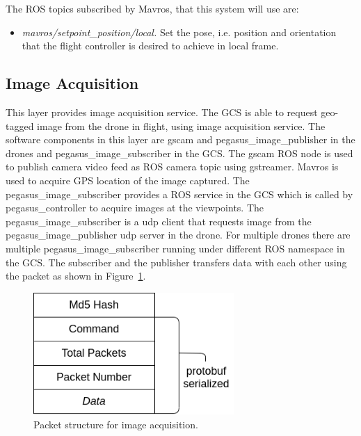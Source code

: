 The ROS topics subscribed by Mavros, that this system will use are:
\begin{itemize}
	\item \textit{mavros/setpoint\_position/local.} Set the pose, i.e. position and orientation that the flight controller is desired to achieve in local frame.
\end{itemize}


\subsection{Image Acquisition}

This layer provides image acquisition service. The GCS is able to request geo-tagged image from the drone in flight, using image acquisition service. The software components in this layer are gscam and pegasus\_image\_publisher in the drones and pegasus\_image\_subscriber in the GCS. The gscam ROS node is used to publish camera video feed as ROS camera topic using gstreamer. Mavros is used to acquire GPS location of the image captured. The pegasus\_image\_subscriber provides a ROS service in the GCS which is called by pegasus\_controller to acquire images at the viewpoints. The pegasus\_image\_subscriber is a udp client that requests image from the pegasus\_image\_publisher udp server in the drone. For multiple drones there are multiple pegasus\_image\_subscriber running under different ROS namespace in the GCS. The subscriber and the publisher transfers data with each other using the packet as shown in Figure~\ref{fig:image-packet}.

\begin{figure}
	\centering
	\caption[Packet structure for image acquisition.]{\small Packet structure for image acquisition.} 
	\label{fig:image-packet}
	\includegraphics[width=3in]{figures/methodology/methodology-Image-packet}
\end{figure}

